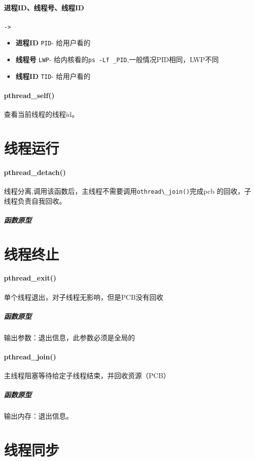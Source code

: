 \documentclass[UTF8,a4paper,12pt]{ctexbook}
\begin{document}
		\paragraph{进程ID、线程号、线程ID}\verb|->|
			\begin{itemize}[itemindent = 1em]
				\item \textbf{进程ID} \verb|PID|- 给用户看的
				\item \textbf{线程号} \verb|LWP|- 给内核看的\verb|ps -Lf _PID|,一般情况PID相同，LWP不同
				\item \textbf{线程ID} \verb|TID|- 给用户看的
			\end{itemize}
		
		\paragraph{pthread\_self()} 查看当前线程的线程id。
	
	\section{线程运行}
		\paragraph{pthread\_detach()}线程分离,调用该函数后，主线程不需要调用\verb|othread\_join()|完成pcb 的回收，子线程负责自我回收。
			\subparagraph{函数原型}
	
	\section{线程终止}	
		\paragraph{pthread\_exit()}单个线程退出，对子线程无影响，但是PCB没有回收
			\subparagraph{函数原型} 输出参数：退出信息，此参数必须是全局的
		
		\paragraph{pthread\_join()}主线程阻塞等待给定子线程结束，并回收资源（PCB）
			\subparagraph{函数原型} 输出内存：退出信息。
		
	
	\section{线程同步}
\end{document}
